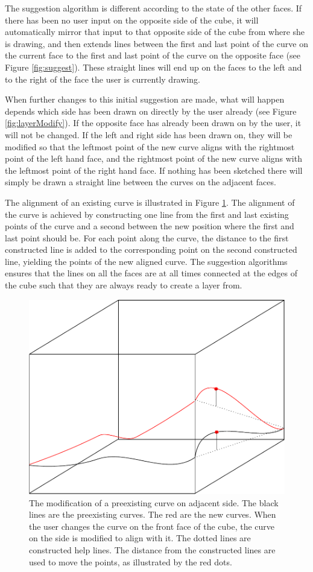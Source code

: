 \documentclass[a4paper,12pt]{report}
\begin{document}
The suggestion algorithm is different according to the state of the other faces. If there has been no user input on the opposite side of the cube, it will automatically mirror that input to that opposite side of the cube from where she is drawing, and then extends lines between the first and last point of the curve on the current face to the first and last point of the curve on the opposite face (see Figure \ref{fig:suggest}). These straight lines will end up on the faces to the left and to the right of the face the user is currently  drawing. 

When further changes to this initial suggestion are made, what will happen depends which side has been drawn on directly by the user already (see Figure \ref{fig:layerModify}). If the opposite face has already been drawn on by the user, it will not be changed. If the left and right side has been drawn on, they will be modified so that the leftmost point of the new curve aligns with the rightmost point of the left hand face, and the rightmost point of 
the new curve aligns with the leftmost point of the right hand face. If nothing has been sketched there will simply be drawn a straight line between the curves on the adjacent faces.

 The alignment of an existing curve is illustrated in Figure \ref{fig:changeSide}. The alignment of the curve is achieved by constructing one line from the first and last existing points of the curve and a second between the new position where the first and last point should be. For each point along the curve, the distance to the first constructed line is added to the corresponding point on the second constructed line, yielding the points of the new aligned curve. The suggestion algorithms ensures that the lines on all the faces are at all times connected at the edges of the cube such that they are always ready to create a layer from.

\begin{figure}
\centering
\includegraphics[width=.8\linewidth]{thesis/changeSide.pdf}
 \caption{The modification of a preexisting curve on adjacent side. The black lines are the preexisting curves. The red are the new curves. When the user changes the curve on the front face of the cube, the curve on the side is modified to align with it. The dotted lines are constructed help lines. The distance from the constructed lines are used to move the points, as illustrated by the red dots.}
 \label{fig:changeSide}
\end{figure}
\end{document}
